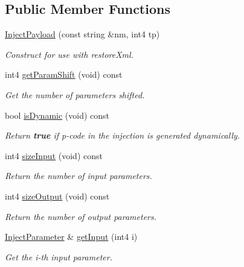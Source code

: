 \subsection*{Public Member Functions}
\begin{DoxyCompactItemize}
\item 
\mbox{\hyperlink{class_inject_payload_a9156655ff65b12ea653d9ef954115022}{Inject\+Payload}} (const string \&nm, int4 tp)
\begin{DoxyCompactList}\small\item\em Construct for use with restore\+Xml. \end{DoxyCompactList}\item 
int4 \mbox{\hyperlink{class_inject_payload_ab4d3acac3d46171c7d51f40c835d65c3}{get\+Param\+Shift}} (void) const
\begin{DoxyCompactList}\small\item\em Get the number of parameters shifted. \end{DoxyCompactList}\item 
bool \mbox{\hyperlink{class_inject_payload_ab8b97f98305f0175df23f2b9733b0afa}{is\+Dynamic}} (void) const
\begin{DoxyCompactList}\small\item\em Return {\bfseries{true}} if p-\/code in the injection is generated dynamically. \end{DoxyCompactList}\item 
int4 \mbox{\hyperlink{class_inject_payload_ab617ea269804abb9b752af9f659811e5}{size\+Input}} (void) const
\begin{DoxyCompactList}\small\item\em Return the number of input parameters. \end{DoxyCompactList}\item 
int4 \mbox{\hyperlink{class_inject_payload_aca3efb5572ec0a76732554ee41600193}{size\+Output}} (void) const
\begin{DoxyCompactList}\small\item\em Return the number of output parameters. \end{DoxyCompactList}\item 
\mbox{\hyperlink{class_inject_parameter}{Inject\+Parameter}} \& \mbox{\hyperlink{class_inject_payload_a1ad1b32858dcd08f0dd006ec000ace9d}{get\+Input}} (int4 i)
\begin{DoxyCompactList}\small\item\em Get the i-\/th input parameter. \end{DoxyCompactList}\item 

\end{DoxyCompactItemize}
